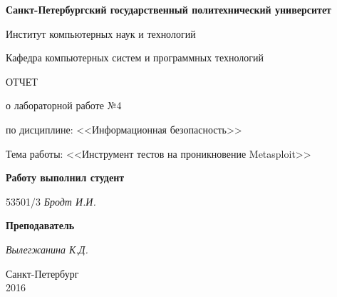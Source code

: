 \begin{titlepage}
\begin{center}

\textbf{Санкт-Петербургский государственный политехнический университет}

\vspace{5mm}
Институт компьютерных наук и технологий

\vspace{5mm}
Кафедра компьютерных систем и программных технологий

\vspace*{\fill}

\huge{ОТЧЕТ}

\Large{о лабораторной работе №4}
\vspace{2mm}

\large{по дисциплине: <<Информационная безопасность>>}

\vspace*{2mm}
\large{Тема работы: <<Инструмент тестов на проникновение Metasploit>>}

\vspace*{\fill}
\end{center}

\begin{large}
\hspace{0.25\linewidth} \textbf{Работу выполнил студент}

\vspace{5mm}
\hspace{0.25\linewidth} 53501/3 \hspace{5mm} \textit{Бродт И.И.}

\vspace{3mm}
\hspace{0.25\linewidth} \textbf{Преподаватель}

\vspace{5mm}
\hspace{0.25\linewidth} \underline{\hspace{2cm} } \hspace{3mm} \textit{Вылегжанина К.Д.}
\end{large}

\vspace*{3cm}

\begin{center}
\normalsize Санкт-Петербург\\2016
\end{center}
\end{titlepage}